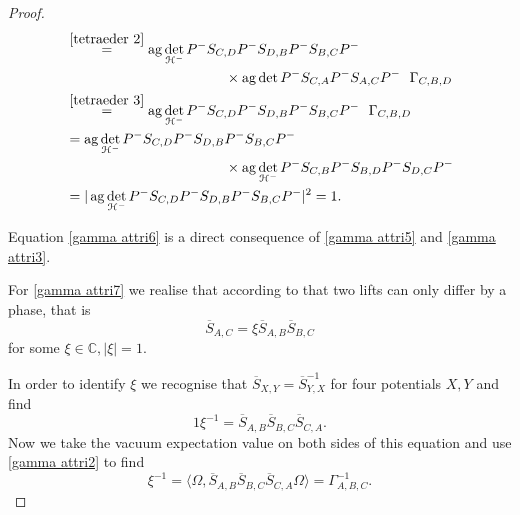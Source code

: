 \documentclass[b5paper,draft,openbib,12pt]{memoir}
\DeclareMathOperator{\ag}{ag}
\begin{document}
\begin{proof}
\begin{align}
&\overset{\eqref{tetraeder 2}}{=}
\ag \det_{\mathcal{H}^-}P^- S_{C,D}P^- S_{D,B}P^-S_{B,C}P^-\\
&\hspace{4cm}\times \ag \det P^- S_{C,A}P^- S_{A,C}P^-     ~~ \Gamma_{C,B,D}\\
&\overset{\eqref{tetraeder 3}}{=}
\ag \det_{\mathcal{H}^-}P^- S_{C,D}P^- S_{D,B}P^-S_{B,C}P^-  ~~ \Gamma_{C,B,D}\\\notag
&=
\ag \det_{\mathcal{H}^-}P^- S_{C,D}P^- S_{D,B}P^-S_{B,C}P^- \\
&\hspace{4cm}\times \ag \det_{\mathcal{H}^-} P^- S_{C,B}P^- S_{B,D}P^- S_{D,C}P^- \\
&=
|\ag \det_{\mathcal{H}^-}P^- S_{C,D}P^- S_{D,B}P^-S_{B,C}P^-|^2=1. 
\end{align}

Equation \eqref{gamma attri6} is a direct consequence of \eqref{gamma attri5} and \eqref{gamma attri3}.

For \eqref{gamma attri7} we realise that according to \cite{ivp0} that two lifts can only differ by a phase,
that is
\begin{equation}
\overline{S}_{A,C}=\xi \overline{S}_{A,B} \overline{S}_{B,C}
\end{equation}
for some \(\xi\in \mathbb{C}, |\xi|=1\). 

In order to identify \(\xi\) we recognise that \(\overline{S}_{X,Y}=\overline{S}_{Y,X}^{-1}\) for four potentials \(X,Y\) 
and find
\begin{equation}
1 \xi^{-1}= \overline{S}_{A,B} \overline{S}_{B,C}\overline{S}_{C,A}.
\end{equation}
Now we take the vacuum expectation value on both sides of this equation and use \eqref{gamma attri2} to find
\begin{equation}
\xi^{-1}=\langle\Omega,\overline{S}_{A,B} \overline{S}_{B,C}\overline{S}_{C,A}\Omega\rangle = \Gamma_{A,B,C}^{-1}.
\end{equation}


\end{proof}
\end{document}
